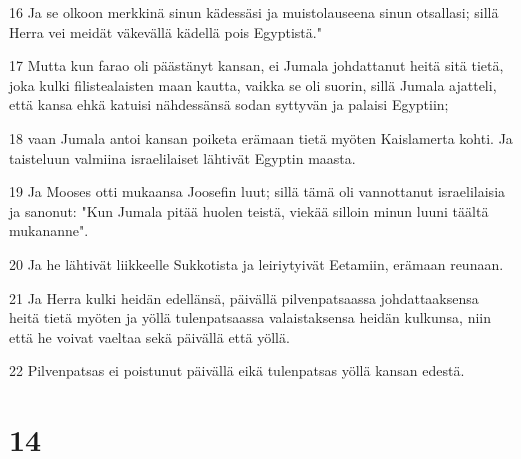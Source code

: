 \par 16 Ja se olkoon merkkinä sinun kädessäsi ja muistolauseena sinun otsallasi; sillä Herra vei meidät väkevällä kädellä pois Egyptistä."
\par 17 Mutta kun farao oli päästänyt kansan, ei Jumala johdattanut heitä sitä tietä, joka kulki filistealaisten maan kautta, vaikka se oli suorin, sillä Jumala ajatteli, että kansa ehkä katuisi nähdessänsä sodan syttyvän ja palaisi Egyptiin;
\par 18 vaan Jumala antoi kansan poiketa erämaan tietä myöten Kaislamerta kohti. Ja taisteluun valmiina israelilaiset lähtivät Egyptin maasta.
\par 19 Ja Mooses otti mukaansa Joosefin luut; sillä tämä oli vannottanut israelilaisia ja sanonut: "Kun Jumala pitää huolen teistä, viekää silloin minun luuni täältä mukananne".
\par 20 Ja he lähtivät liikkeelle Sukkotista ja leiriytyivät Eetamiin, erämaan reunaan.
\par 21 Ja Herra kulki heidän edellänsä, päivällä pilvenpatsaassa johdattaaksensa heitä tietä myöten ja yöllä tulenpatsaassa valaistaksensa heidän kulkunsa, niin että he voivat vaeltaa sekä päivällä että yöllä.
\par 22 Pilvenpatsas ei poistunut päivällä eikä tulenpatsas yöllä kansan edestä.

\chapter{14}

